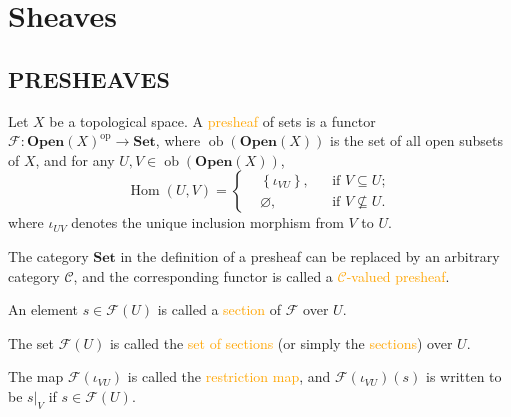 \chapter{Sheaves}

\section*{PRESHEAVES}

\begin{definition}
	Let $X$ be a topological space. A \textcolor{orange}{presheaf} of sets is a functor $\mathcal{F}:\mathbf{Open}(X)^\text{op}\rightarrow\mathbf{Set}$, where $\operatorname{ob}\left(\mathbf{Open}(X)\right)$ is the set of all open subsets of $X$, and for any $U, V \in \operatorname{ob}\left(\mathbf{Open}(X)\right)$,
\begin{equation*}
	\operatorname{Hom}\left(U,V\right)=\left\{\begin{aligned}
		&\left\{\iota_{VU}\right\}, && \text{if }V\subseteq U;\\
		&\varnothing, && \text{if }V\nsubseteq U.
	\end{aligned}\right.
\end{equation*}
where $\iota_{UV}$ denotes the unique inclusion morphism from $V$ to $U$.

The category $\mathbf{Set}$ in the definition of a presheaf can be replaced by an arbitrary category $\mathcal{C}$, and the corresponding functor is called a \textcolor{orange}{$\mathcal{C}$-valued presheaf}. 
\end{definition}

\begin{definition}
	An element $s \in \mathcal{F}(U)$ is called a \textcolor{orange}{section} of $\mathcal{F}$ over $U$.
	
	The set $\mathcal{F}(U)$ is called the \textcolor{orange}{set of sections} (or simply the \textcolor{orange}{sections}) over $U$.
	
	The map $\mathcal{F}\!\left(\iota_{VU}\right)$ is called the \textcolor{orange}{restriction map}, and $\mathcal{F}\!\left(\iota_{VU}\right)(s)$ is written to be $s|_V$ if $s\in\mathcal{F}(U)$.
\end{definition}

